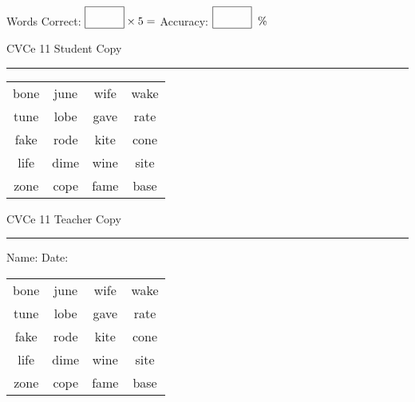 \documentclass{memoir}
\begin{document}
\small

Words Correct: $\fbox{\phantom{\huge 100}} \times 5 = $ Accuracy: $\fbox{\phantom{\huge 100}}\;\; \%$ 

\vfill

\newpage


\footnotesize \noindent
CVCe 11 \hfill Student Copy
\smallskip
\hrule

\Large

\setlength{\tabcolsep}{14pt}
\def\arraystretch{2}

{\selectfont


\begin{vplace}[0.5]
\begin{center}
\begin{tabular}{cccc}
bone & june & wife & wake \\
tune & lobe & gave & rate \\
fake & rode & kite & cone \\
life & dime & wine & site \\
zone & cope & fame & base \\
\end{tabular}
\end{center}
\end{vplace}

}

\newpage

\footnotesize \noindent
CVCe 11 \hfill Teacher Copy
\smallskip
\hrule

\small

\vfill

\noindent
Name: \underline{\hspace{1.75in}} \hfill Date: \underline{\hspace{1in}}

\Large

{\selectfont


\begin{vplace}[0.5]
\begin{center}
\begin{tabular}{cccc}
bone & june & wife & wake \\
tune & lobe & gave & rate \\
fake & rode & kite & cone \\
life & dime & wine & site \\
zone & cope & fame & base \\
\end{tabular}
\end{center}
\end{vplace}



}
\end{document}
